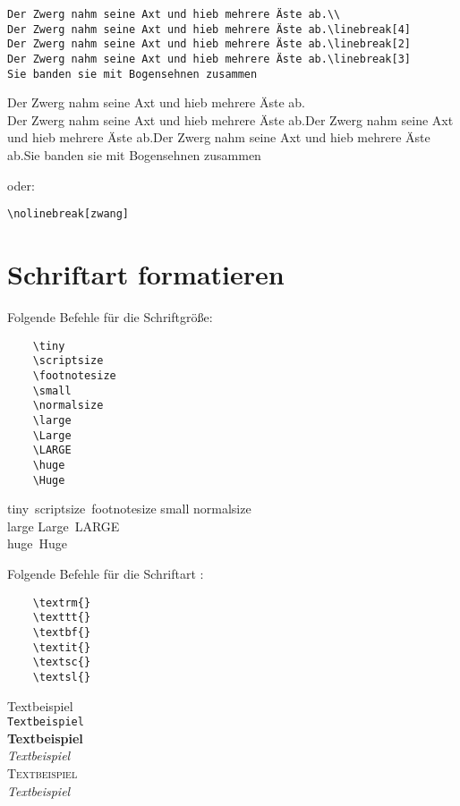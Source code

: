 \documentclass{like}
\begin{document}
\begin{verbatim}
Der Zwerg nahm seine Axt und hieb mehrere Äste ab.\\
Der Zwerg nahm seine Axt und hieb mehrere Äste ab.\linebreak[4]
Der Zwerg nahm seine Axt und hieb mehrere Äste ab.\linebreak[2]
Der Zwerg nahm seine Axt und hieb mehrere Äste ab.\linebreak[3]
Sie banden sie mit Bogensehnen zusammen
\end{verbatim}
Der Zwerg nahm seine Axt und hieb mehrere Äste ab.\\
Der Zwerg nahm seine Axt und hieb mehrere Äste ab.\linebreak[4]
Der Zwerg nahm seine Axt und hieb mehrere Äste ab.\linebreak[2]
Der Zwerg nahm seine Axt und hieb mehrere Äste ab.\linebreak[3]
Sie banden sie mit Bogensehnen zusammen
\par
oder:
\begin{verbatim}
\nolinebreak[zwang]
\end{verbatim}
\section{Schriftart formatieren}

Folgende Befehle für die Schriftgröße:\par\smallskip

\qquad\begin{minipage}{0.4\textwidth}
	\vspace*{-0,3cm}
	\begin{verbatim}
	\tiny
	\scriptsize
	\footnotesize
	\small
	\normalsize
	\large
	\Large
	\LARGE
	\huge
	\Huge
	\end{verbatim}
\end{minipage}
\hspace*{0,8cm}
\begin{minipage}{0.4\textwidth}
	\tiny tiny\,
	\scriptsize scriptsize\,
	\footnotesize footnotesize\;
	\small small\;
	\normalsize normalsize\\
	\large large\;
	\Large Large\
	\LARGE LARGE\\
	\huge huge\,
	\Huge Huge\;
\end{minipage}\normalsize


Folgende Befehle für die Schriftart :

\qquad\begin{minipage}{0.2\textwidth}
	\begin{verbatim}
	\textrm{} 
	\texttt{} 
	\textbf{} 
	\textit{} 
	\textsc{} 
	\textsl{} 
	\end{verbatim}
\end{minipage}\quad
\begin{minipage}{0.4\textwidth}
	\textrm{Textbeispiel} \\
	\texttt{Textbeispiel} \\
	\textbf{Textbeispiel} \\
	\textit{Textbeispiel} \\
	\textsc{Textbeispiel} \\
	\textsl{Textbeispiel} 
\end{minipage}
\end{document}
